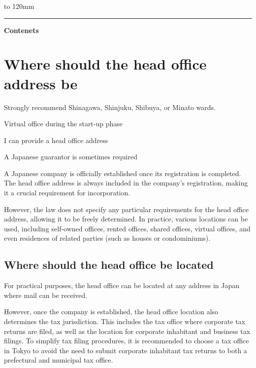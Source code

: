  \renewcommand{\headrulewidth}{11pt}%
 \hbox to 120mm{%
 \color{dominant} \leaders\hrule height11pt\hfil}


\vspace{18mm}
{\color{dominant} \LARGE \bfseries Contenets}
\vspace{-5mm}
\setcounter{tocdepth}{2}
\tableofcontents
\clearpage

\vspace{-20pt}


\section{Where should the head office address be}

\begin{coloritemize}
\item Strongly recommend Shinagawa, Shinjuku, Shibuya, or Minato wards.
\item Virtual office during the start-up phase
\item I can provide a head office address
\item A Japanese guarantor is sometimes required
\end{coloritemize}

A Japanese company is officially established once its registration is completed. The head office address is always included in the company's registration, making it a crucial requirement for incorporation.

However, the law does not specify any particular requirements for the head office address, allowing it to be freely determined. In practice, various locations can be used, including self-owned offices, rented offices, shared offices, virtual offices, and even residences of related parties (such as houses or condominiums).

\subsection{Where should the head office be located}

For practical purposes, the head office can be located at any address in Japan where mail can be received.

However, once the company is established, the head office location also determines the tax jurisdiction. This includes the tax office where corporate tax returns are filed, as well as the location for corporate inhabitant and business tax filings. To simplify tax filing procedures, it is recommended to choose a tax office in Tokyo to avoid the need to submit corporate inhabitant tax returns to both a prefectural and municipal tax office.

